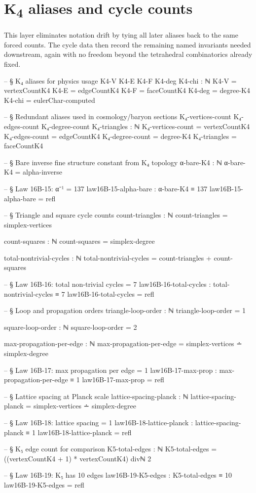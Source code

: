 \documentclass[11pt,a4paper]{book}
\begin{document}
\section{K\textsubscript{4} aliases and cycle counts}

This layer eliminates notation drift by tying all later aliases back to the same forced counts. The cycle data then record the remaining named invariants needed downstream, again with no freedom beyond the tetrahedral combinatorics already fixed.

\begin{code}
-- § K₄ aliases for physics usage
K4-V K4-E K4-F K4-deg K4-chi : ℕ
K4-V   = vertexCountK4
K4-E   = edgeCountK4
K4-F   = faceCountK4
K4-deg = degree-K4
K4-chi = eulerChar-computed

-- § Redundant aliases used in cosmology/baryon sections
K₄-vertices-count K₄-edges-count K₄-degree-count K₄-triangles : ℕ
K₄-vertices-count = vertexCountK4
K₄-edges-count    = edgeCountK4
K₄-degree-count   = degree-K4
K₄-triangles      = faceCountK4

-- § Bare inverse fine structure constant from K₄ topology
α-bare-K4 : ℕ
α-bare-K4 = alpha-inverse

-- § Law 16B-15: α⁻¹ = 137
law16B-15-alpha-bare : α-bare-K4 ≡ 137
law16B-15-alpha-bare = refl

-- § Triangle and square cycle counts
count-triangles : ℕ
count-triangles = simplex-vertices

count-squares : ℕ
count-squares = simplex-degree

total-nontrivial-cycles : ℕ
total-nontrivial-cycles = count-triangles + count-squares

-- § Law 16B-16: total non-trivial cycles = 7
law16B-16-total-cycles : total-nontrivial-cycles ≡ 7
law16B-16-total-cycles = refl

-- § Loop and propagation orders
triangle-loop-order : ℕ
triangle-loop-order = 1

square-loop-order : ℕ
square-loop-order = 2

max-propagation-per-edge : ℕ
max-propagation-per-edge = simplex-vertices ∸ simplex-degree

-- § Law 16B-17: max propagation per edge = 1
law16B-17-max-prop : max-propagation-per-edge ≡ 1
law16B-17-max-prop = refl

-- § Lattice spacing at Planck scale
lattice-spacing-planck : ℕ
lattice-spacing-planck = simplex-vertices ∸ simplex-degree

-- § Law 16B-18: lattice spacing = 1
law16B-18-lattice-planck : lattice-spacing-planck ≡ 1
law16B-18-lattice-planck = refl

-- § K₅ edge count for comparison
K5-total-edges : ℕ
K5-total-edges = ((vertexCountK4 + 1) * vertexCountK4) divℕ 2

-- § Law 16B-19: K₅ has 10 edges
law16B-19-K5-edges : K5-total-edges ≡ 10
law16B-19-K5-edges = refl
\end{code}
\end{document}
